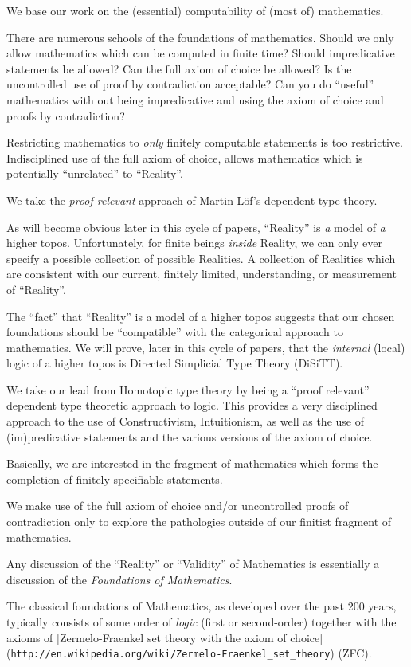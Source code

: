 \documentclass[a4paper,openany]{amsbook}
\begin{document}
We base our work on the (essential) computability of (most of) mathematics.

There are numerous schools of the foundations of mathematics.  Should we only
allow mathematics which can be computed in finite time? Should impredicative
statements be allowed? Can the full axiom of choice be allowed?  Is the
uncontrolled use of proof by contradiction acceptable? Can you do ``useful''
mathematics with out being impredicative and using the axiom of choice and
proofs by contradiction?

Restricting mathematics to \emph{only} finitely computable statements is too
restrictive. Indisciplined use of the full axiom of choice, allows mathematics
which is potentially ``unrelated'' to ``Reality''.

We take the \emph{proof relevant} approach of Martin-L\"of's dependent type
theory.

As will become obvious later in this cycle of papers, ``Reality'' is \emph{a}
model of \emph{a} higher topos.  Unfortunately, for finite beings \emph{inside}
Reality, we can only ever specify a possible collection of possible Realities. A
collection of Realities which are consistent with our current, finitely limited,
understanding, or measurement of ``Reality''.

The ``fact'' that ``Reality'' is a model of a higher topos suggests that our
chosen foundations should be ``compatible'' with the categorical approach to
mathematics. We will prove, later in this cycle of papers, that the
\emph{internal} (local) logic of a higher topos is Directed Simplicial Type
Theory (DiSiTT).

We take our lead from Homotopic type theory by being a ``proof relevant''
dependent type theoretic approach to logic. This provides a very disciplined
approach to the use of Constructivism, Intuitionism, as well as the use of
(im)predicative statements and the various versions of the axiom of choice.

Basically, we are interested in the fragment of mathematics which forms the
completion of finitely specifiable statements.

We make use of the full axiom of choice and/or uncontrolled proofs of
contradiction only to explore the pathologies outside of our finitist fragment
of mathematics.

Any discussion of the ``Reality'' or ``Validity'' of Mathematics is essentially
a discussion of the \textit{Foundations of Mathematics}.

The classical foundations of Mathematics, as developed over the past 200 years,
typically consists of some order of \emph{logic} (first or second-order)
together with the axioms of [Zermelo-Fraenkel set theory with the axiom of
choice](\verb|http://en.wikipedia.org/wiki/Zermelo-Fraenkel_set_theory|) (ZFC).
\end{document}
